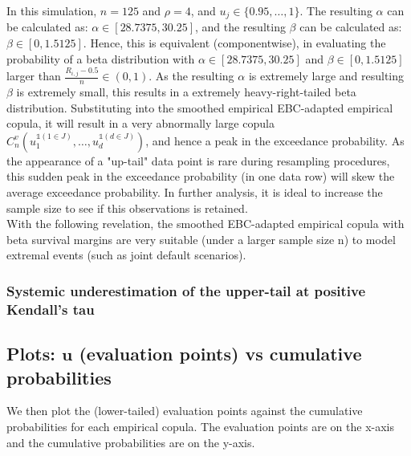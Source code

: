 \documentclass[12pt]{report}
\newcommand{\1}{\mathbf{1}}
\begin{document}
\begin{flushleft}
In this simulation, $n = 125$ and $\rho = 4$, and $u_{j} \in \{0.95, \dots, 1\}$. The resulting $\alpha$ can be calculated as: $\alpha \in [28.7375, 30.25]$, and the resulting $\beta$ can be calculated as: $\beta \in [0, 1.5125]$. Hence, this is equivalent (componentwise), in evaluating the probability of a beta distribution with $\alpha \in [28.7375, 30.25]$ and $\beta \in [0, 1.5125]$ larger than $\frac{R_{i,j} - 0.5}{n} \in (0,1)$. As the resulting $\alpha$ is extremely large and resulting $\beta$ is extremely small, this results in a extremely heavy-right-tailed beta distribution. Substituting into the smoothed empirical EBC-adapted empirical copula, it will result in a very abnormally large copula $C^{v}_{n} \left( u_{1}^{\mathds{1}(1\in J)}, \dots, u_{d}^{\mathds{1}(d\in J)} \right)$, and hence a peak in the exceedance probability. As the appearance of a "up-tail" data point is rare during resampling procedures, this sudden peak in the exceedance probability (in one data row) will skew the average exceedance probability. In further analysis, it is ideal to increase the sample size to see if this observations is retained.\\
\vspace{0.5cm}
With the following revelation, the smoothed EBC-adapted empirical copula with beta survival margins are very suitable (under a larger sample size n) to model extremal events (such as joint default scenarios).

\subsubsection{Systemic underestimation of the upper-tail at positive Kendall's tau}

\newpage
\subsection{Plots: $\textbf{u}$ (evaluation points) vs cumulative probabilities}
\vspace{0.5cm}
We then plot the (lower-tailed) evaluation points against the cumulative probabilities for each empirical copula. The evaluation points are on the x-axis and the cumulative probabilities are on the y-axis.


\end{flushleft}
\end{document}
